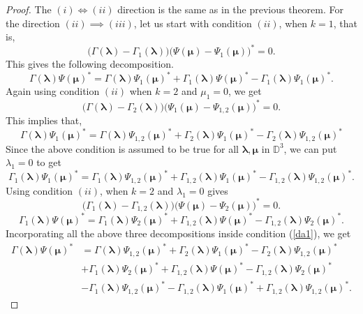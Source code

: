 \documentclass[12pt]{amsart}
\theoremstyle{definition}
\newcommand{\D}{\mathbb{D}}
\newcommand{\1}{{\mbox{\bf 1}}}
\begin{document}
\begin{proof}
The $(i) \iff (ii)$ direction is the same as in the previous theorem.  For the direction $(ii) \implies (iii)$, let us start with condition $(ii)$, when $k=1$, that is,
\[
\big( \Gamma(\bm{\lambda}) - \Gamma_1(\bm{\lambda}) \big) \big( \Psi(\bm{\mu}) - \Psi_1(\bm{\mu}) \big)^* = 0.
\]
This gives the following decomposition.
\begin{equation}\label{da1}
\Gamma(\bm{\lambda})  \Psi(\bm{\mu})^* =  \Gamma(\bm{\lambda}) \Psi_1(\bm{\mu})^* + \Gamma_1(\bm{\lambda})\Psi(\bm{\mu})^* - \Gamma_1(\bm{\lambda}) \Psi_1(\bm{\mu})^*.
\end{equation}
Again using condition $(ii)$ when $k=2$ and $\mu_1 = 0$, we get
\[
\big( \Gamma(\bm{\lambda}) - \Gamma_2(\bm{\lambda}) \big) \big( \Psi_{1}(\bm{\mu}) - \Psi_{1,2}(\bm{\mu}) \big)^* = 0.
\]
This implies that,
\[
 \Gamma(\bm{\lambda}) \Psi_1(\bm{\mu})^* =   \Gamma(\bm{\lambda}) \Psi_{1,2}(\bm{\mu})^* + \Gamma_2(\bm{\lambda}) \Psi_1(\bm{\mu})^* - \Gamma_2(\bm{\lambda}) \Psi_{1,2}(\bm{\mu})^* 
\]
Since the above condition is assumed to be true for all $\bm{\lambda}, \bm{\mu}$ in $\D^3$, we can put $\lambda_1 = 0$ to get
\[
\Gamma_1(\bm{\lambda}) \Psi_{1}(\bm{\mu})^* = \Gamma_1(\bm{\lambda}) \Psi_{1,2}(\bm{\mu})^*
+ \Gamma_{1,2}(\bm{\lambda})  \Psi_{1}(\bm{\mu})^* - \Gamma_{1,2}(\bm{\lambda}) \Psi_{1,2}(\bm{\mu})^*.
\]
Using condition $(ii)$, when $k=2$ and $\lambda_1 = 0$ gives
\[
\big( \Gamma_1(\bm{\lambda}) - \Gamma_{1,2}(\bm{\lambda}) \big) \big( \Psi(\bm{\mu}) - \Psi_{2}(\bm{\mu}) \big)^* = 0.
\]
\begin{equation*}
\Gamma_1(\bm{\lambda})\Psi(\bm{\mu})^* =  \Gamma_1(\bm{\lambda})\Psi_2(\bm{\mu})^* + \Gamma_{1,2}(\bm{\lambda}) \Psi(\bm{\mu})^* - \Gamma_{1,2}(\bm{\lambda}) \Psi_{2}(\bm{\mu})^*.
\end{equation*}
Incorporating all the above three decompositions inside condition (\ref{da1}), we get
\begin{equation}\label{da2}
\begin{split}
\Gamma(\bm{\lambda})  \Psi(\bm{\mu})^* &=  \Gamma(\bm{\lambda}) \Psi_{1,2}(\bm{\mu})^* + \Gamma_2(\bm{\lambda}) \Psi_1(\bm{\mu})^* - \Gamma_2(\bm{\lambda}) \Psi_{1,2}(\bm{\mu})^* \\
&+ \Gamma_1(\bm{\lambda})\Psi_2(\bm{\mu})^* + \Gamma_{1,2}(\bm{\lambda}) \Psi(\bm{\mu})^* - \Gamma_{1,2}(\bm{\lambda}) \Psi_{2}(\bm{\mu})^* \\
&- \Gamma_1(\bm{\lambda}) \Psi_{1,2}(\bm{\mu})^*
- \Gamma_{1,2}(\bm{\lambda})  \Psi_{1}(\bm{\mu})^* + \Gamma_{1,2}(\bm{\lambda}) \Psi_{1,2}(\bm{\mu})^*.

\end{split}
\end{equation}
\end{proof}
\end{document}
